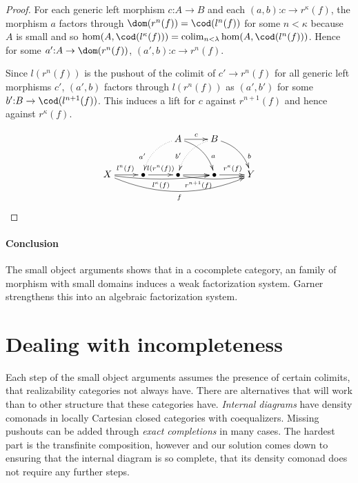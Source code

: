 \documentclass{tac}
\newcommand\of{\mathord:}
\newcommand\colim{\mathop{\mathrm{colim}}}
\begin{document}
\begin{proof}
For each generic left morphism $c\of A \to B$ and each $(a,b)\of c\to r^\kappa(f)$, the morphism $a$ factors through $\dom(r^n(f)) = \cod(l^n(f))$ for some $n<\kappa$ because $A$ is small and so $\hom(A,\cod(l^\kappa(f))) =\colim_{n<\lambda} \hom(A,\cod(l^n(f)))$.
Hence for some $a'\of A\to \dom(r^n(f))$, $(a',b)\of c\to r^n(f)$.

Since $l(r^n(f))$ is the pushout of the colimit of $c'\to r^n(f)$ for all generic left morphisms $c'$, $(a',b)$ factors through $l(r^n(f))$ as $(a',b')$ for some $b'\of B \to \cod(l^{n+1}(f))$. This induces a lift for $c$ against $r^{n+1}(f)$ and hence against $r^\kappa(f)$.

\[\xymatrix{
&& A\ar[r]^{c}\ar@/^2ex/[dr]^(.7)a\ar@{.>}@/_2ex/[dl]_(.7){a'} & B\ar@/^2ex/[dr]^(.7)b\ar@{.>}@/_2ex/[dl]_(.7){b'} \\
X \ar[r]^{l^n(f)} \ar@/_1ex/[rrr]_{l^{\kappa}(f)} \ar@/_4ex/[rrrr]_{f} & \bullet \ar[r]^{l(r^n(f))}  & \bullet \ar[r]\ar@/_1ex/[rr]_(.3){r^{n+1}(f)} & \bullet \ar[r]^{r^\kappa(f)} & Y
}\]
\end{proof}

\paragraph{Conclusion}
The small object arguments shows that in a cocomplete category, an family of morphism with small domains induces a weak factorization system. Garner %
strengthens this into an algebraic factorization system.

\section{Dealing with incompleteness}
Each step of the small object arguments assumes the presence of certain colimits, that realizability categories not always have. There are alternatives that will work than to other structure that these categories have.
 \emph{Internal diagrams} have density comonads in locally Cartesian closed categories with coequalizers. %
 Missing pushouts can be added through \emph{exact completions} in many cases.
The hardest part is the transfinite composition, however and our solution comes down to ensuring that the internal diagram is so complete, that its density comonad does not require any further steps.
\end{document}
